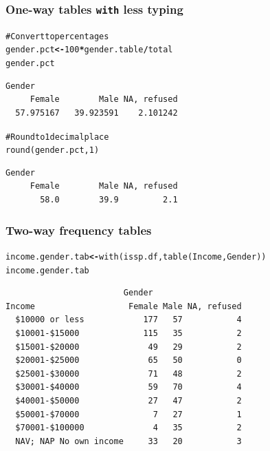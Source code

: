 \documentclass[handout]{beamer}\usepackage[]{graphicx}\usepackage[]{color}
\makeatletter
\newcommand{\hlnum}[1]{\textcolor[rgb]{0.533,0,0.133}{#1}}%
\newcommand{\hlcom}[1]{\textcolor[rgb]{1,0.533,0}{#1}}%
\newcommand{\hlopt}[1]{\textcolor[rgb]{0,0,0}{\textbf{#1}}}%
\newcommand{\hlstd}[1]{\textcolor[rgb]{0,0,0}{#1}}%
\newcommand{\hlkwb}[1]{\textcolor[rgb]{0,0,0.4}{\textbf{#1}}}%
\newcommand{\hlkwd}[1]{\textcolor[rgb]{0,0.267,0.4}{#1}}%
\newenvironment{kframe}{%
 \def\at@end@of@kframe{}%
 \ifinner\ifhmode%
  \def\at@end@of@kframe{\end{minipage}}%
  \begin{minipage}{\columnwidth}%
 \fi\fi%
 \def\FrameCommand##1{\hskip\@totalleftmargin \hskip-\fboxsep
 \colorbox{shadecolor}{##1}\hskip-\fboxsep
     \hskip-\linewidth \hskip-\@totalleftmargin \hskip\columnwidth}%
 \MakeFramed {\advance\hsize-\width
   \@totalleftmargin\z@ \linewidth\hsize
   \@setminipage}}%
 {\par\unskip\endMakeFramed%
 \at@end@of@kframe}
\newenvironment{knitrout}{}{} %
\makeatother
\begin{document}
\begin{frame}[fragile]
  \frametitle{One-way tables \texttt{with} less typing}

\begin{knitrout}
\color{fgcolor}\begin{kframe}
\begin{alltt}
\hlcom{#Convert to percentages}
\hlstd{gender.pct} \hlkwb{<-} \hlnum{100}\hlopt{*}\hlstd{gender.table}\hlopt{/}\hlstd{total}
\hlstd{gender.pct}
\end{alltt}
\begin{verbatim}
Gender
     Female        Male NA, refused 
  57.975167   39.923591    2.101242 
\end{verbatim}
\begin{alltt}
\hlcom{# Round to 1 decimal place}
\hlkwd{round}\hlstd{(gender.pct,} \hlnum{1}\hlstd{)}
\end{alltt}
\begin{verbatim}
Gender
     Female        Male NA, refused 
       58.0        39.9         2.1 
\end{verbatim}
\end{kframe}
\end{knitrout}
\end{frame}

\begin{frame}[fragile]
  \frametitle{Two-way frequency tables}
\begin{knitrout}
\color{fgcolor}\begin{kframe}
\begin{alltt}
\hlstd{income.gender.tab} \hlkwb{<-} \hlkwd{with}\hlstd{(issp.df,} \hlkwd{table}\hlstd{(Income, Gender))}
\hlstd{income.gender.tab}
\end{alltt}
\begin{verbatim}
                        Gender
Income                   Female Male NA, refused
  $10000 or less            177   57           4
  $10001-$15000             115   35           2
  $15001-$20000              49   29           2
  $20001-$25000              65   50           0
  $25001-$30000              71   48           2
  $30001-$40000              59   70           4
  $40001-$50000              27   47           2
  $50001-$70000               7   27           1
  $70001-$100000              4   35           2
  NAV; NAP No own income     33   20           3
\end{verbatim}
\end{kframe}
\end{knitrout}
\end{frame}
\end{document}
